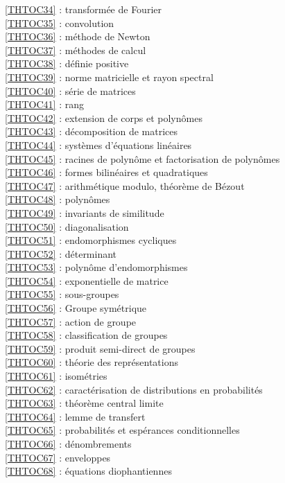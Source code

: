 \ref {THTOC34} : transformée de Fourier\\
\ref {THTOC35} : convolution\\
\ref {THTOC36} : méthode de Newton\\
\ref {THTOC37} : méthodes de calcul\\
\ref {THTOC38} : définie positive\\
\ref {THTOC39} : norme matricielle et rayon spectral\\
\ref {THTOC40} : série de matrices\\
\ref {THTOC41} : rang\\
\ref {THTOC42} : extension de corps et polynômes\\
\ref {THTOC43} : décomposition de matrices\\
\ref {THTOC44} : systèmes d'équations linéaires\\
\ref {THTOC45} : racines de polynôme et factorisation de polynômes\\
\ref {THTOC46} : formes bilinéaires et quadratiques\\
\ref {THTOC47} : arithmétique modulo, théorème de Bézout\\
\ref {THTOC48} : polynômes\\
\ref {THTOC49} : invariants de similitude\\
\ref {THTOC50} : diagonalisation\\
\ref {THTOC51} : endomorphismes cycliques\\
\ref {THTOC52} : déterminant\\
\ref {THTOC53} : polynôme d'endomorphismes\\
\ref {THTOC54} : exponentielle de matrice\\
\ref {THTOC55} : sous-groupes\\
\ref {THTOC56} : Groupe symétrique\\
\ref {THTOC57} : action de groupe\\
\ref {THTOC58} : classification de groupes\\
\ref {THTOC59} : produit semi-direct de groupes\\
\ref {THTOC60} : théorie des représentations\\
\ref {THTOC61} : isométries\\
\ref {THTOC62} : caractérisation de distributions en probabilités\\
\ref {THTOC63} : théorème central limite\\
\ref {THTOC64} : lemme de transfert\\
\ref {THTOC65} : probabilités et espérances conditionnelles\\
\ref {THTOC66} : dénombrements\\
\ref {THTOC67} : enveloppes\\
\ref {THTOC68} : équations diophantiennes\\
